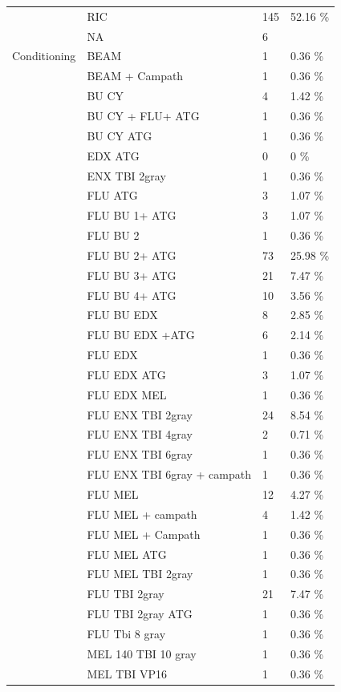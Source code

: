 \documentclass[a4paper,11pt] {article}
\begin{document}
\begin{longtable}{llll}
   & RIC & 145 & 52.16 \% \\ 
   & NA & 6 &  \\ 
  Conditioning & BEAM & 1 & 0.36 \% \\ 
   & BEAM + Campath & 1 & 0.36 \% \\ 
   & BU CY  & 4 & 1.42 \% \\ 
   & BU CY + FLU+ ATG & 1 & 0.36 \% \\ 
   & BU CY ATG & 1 & 0.36 \% \\ 
   & EDX ATG & 0 & 0 \% \\ 
   & ENX TBI 2gray & 1 & 0.36 \% \\ 
   & FLU ATG & 3 & 1.07 \% \\ 
   & FLU BU 1+ ATG & 3 & 1.07 \% \\ 
   & FLU BU 2 & 1 & 0.36 \% \\ 
   & FLU BU 2+ ATG & 73 & 25.98 \% \\ 
   & FLU BU 3+ ATG & 21 & 7.47 \% \\ 
   & FLU BU 4+ ATG & 10 & 3.56 \% \\ 
   & FLU BU EDX & 8 & 2.85 \% \\ 
   & FLU BU EDX +ATG & 6 & 2.14 \% \\ 
   & FLU EDX & 1 & 0.36 \% \\ 
   & FLU EDX ATG & 3 & 1.07 \% \\ 
   & FLU EDX MEL & 1 & 0.36 \% \\ 
   & FLU ENX TBI 2gray & 24 & 8.54 \% \\ 
   & FLU ENX TBI 4gray & 2 & 0.71 \% \\ 
   & FLU ENX TBI 6gray & 1 & 0.36 \% \\ 
   & FLU ENX TBI 6gray + campath & 1 & 0.36 \% \\ 
   & FLU MEL & 12 & 4.27 \% \\ 
   & FLU MEL + campath & 4 & 1.42 \% \\ 
   & FLU MEL + Campath & 1 & 0.36 \% \\ 
   & FLU MEL ATG & 1 & 0.36 \% \\ 
   & FLU MEL TBI 2gray & 1 & 0.36 \% \\ 
   & FLU TBI 2gray & 21 & 7.47 \% \\ 
   & FLU TBI 2gray ATG & 1 & 0.36 \% \\ 
   & FLU Tbi 8 gray & 1 & 0.36 \% \\ 
   & MEL 140 TBI 10 gray & 1 & 0.36 \% \\ 
   & MEL TBI VP16 & 1 & 0.36 \% \\ 

\end{longtable}
\end{document}
